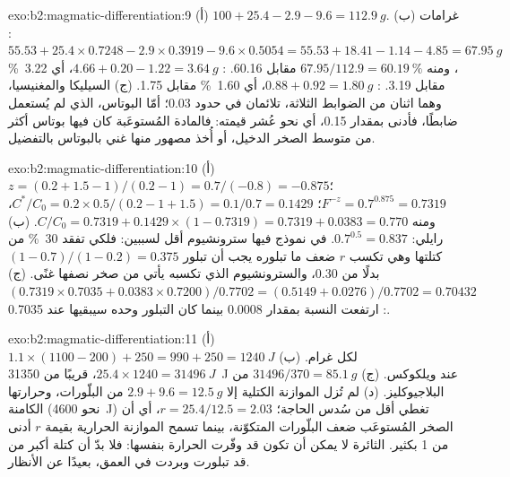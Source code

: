 \begin{solution}{exo:b2:magmatic-differentiation:9}
(أ) $100 + 25.4 - 2.9 - 9.6 = \qty{112.9}{g}$. (ب) غرامات : $55.53 +
25.4\times0.7248 - 2.9\times0.3919 - 9.6\times0.5054 = 55.53 + 18.41 - 1.14 - 4.85 =
\qty{67.95}{g}$، ومنه $67.95/112.9 = \qty{60.19}{\percent}$ مقابل 60.16. :
$4.66 + 0.20 - 1.22 = \qty{3.64}{g}$، أي \qty{3.22}{\percent} مقابل 3.19. :
$0.88 + 0.92 = \qty{1.80}{g}$، أي \qty{1.60}{\percent} مقابل 1.75. (ج) السيليكا والمغنيسيا، وهما اثنان من
الضوابط الثلاثة، تلائمان في حدود 0.03؛ أمّا البوتاس، الذي لم يُستعمل ضابطًا، فأدنى بمقدار 0.15، أي نحو
عُشر قيمته: فالمادة المُستوعَبة كان فيها بوتاس أكثر من متوسط
الصخر الدخيل، أو أُخذ مصهور منها غني بالبوتاس بالتفضيل.
\end{solution}

\begin{solution}{exo:b2:magmatic-differentiation:10}
(أ) $z = (0.2 + 1.5 - 1)/(0.2 - 1) = 0.7/(-0.8) = -0.875$؛ $F^{-z} = 0.7^{0.875} =
0.7319$؛ $C^*/C_0 = 0.2\times0.5/(0.2 - 1 + 1.5) = 0.1/0.7 = 0.1429$، ومنه $C/C_0 =
0.7319 + 0.1429\times(1 - 0.7319) = 0.7319 + 0.0383 = 0.770$. (ب) رايلي:
$0.7^{0.5} = 0.837$.  في نموذج  فيها سترونشيوم أقل لسببين: فلكي تفقد
\qty{30}{\percent} من كتلتها وهي تكسب $r$ ضعف ما تبلوره يجب أن
تبلور $(1 - 0.7)/(1 - 0.2) = 0.375$ بدلًا من 0.30، والسترونشيوم الذي تكسبه
يأتي من صخر نصفها غنًى. (ج) $(0.7319\times0.7035 + 0.0383\times0.7200)/0.7702
= (0.5149 + 0.0276)/0.7702 = 0.70432$: ارتفعت النسبة بمقدار 0.0008 بينما
كان التبلور وحده سيبقيها عند 0.7035.
\end{solution}

\begin{solution}{exo:b2:magmatic-differentiation:11}
(أ) $1.1\times(1100 - 200) + 250 = 990 + 250 = \qty{1240}{J}$ لكل غرام. (ب)
$25.4\times1240 = \qty{31496}{J}$، قريبًا من \qty{31350}{J} عند ويلكوكس. (ج)
$31496/370 = \qty{85.1}{g}$ من البلاجيوكليز. (د) لم تُزل الموازنة الكتلية إلا $2.9 +
9.6 = \qty{12.5}{g}$ من البلّورات، وحرارتها الكامنة (نحو \qty{4600}{J}) تغطي أقل
من سُدس الحاجة؛ $r = 25.4/12.5 = 2.03$، أي أن الصخر المُستوعَب ضعف
البلّورات المتكوّنة، بينما تسمح الموازنة الحرارية بقيمة $r$ أدنى من 1 بكثير.  الثائرة
لا يمكن أن تكون قد وفّرت الحرارة بنفسها: فلا بدّ أن كتلة أكبر من  قد تبلورت
وبردت في العمق، بعيدًا عن الأنظار.
\end{solution}

